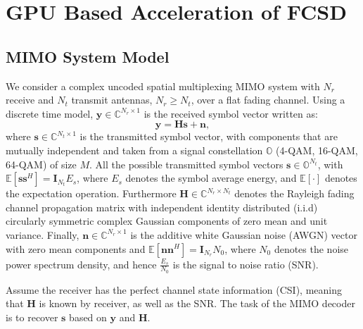 \documentclass[letterpaper, 10pt, conference,twoside]{ieeeconf}
\begin{document}
\section{GPU Based Acceleration of FCSD}\label{GPUFCSD}
\subsection{MIMO System Model}\label{system}

We consider a complex uncoded spatial multiplexing MIMO system with $N_r$ receive and $N_t$ transmit antennas, $N_{r}\geq N_{t}$, over a flat fading channel. Using a discrete time model, $\mathbf{y}\in\mathbb{C}^{N_{r}\times 1}$ is the received symbol vector written as:
\begin{equation}
\mathbf{y}=\mathbf{H}\mathbf{s}+\mathbf{n},   \label{formula 1}
\end{equation}
where $\mathbf{s}\in \mathbb{C}^{N_{t}\times 1}$ is the transmitted symbol vector, with components that are mutually independent and taken from a signal constellation $\mathbb{O}$ (4-QAM, 16-QAM, 64-QAM) of size $M$. All the possible transmitted symbol vectors $\mathbf{s}\in \mathbb{O}^{N_{t}}$, with $\mathbb{E}[\mathbf{s}\mathbf{s}^{H}]=\mathbf{I}_{N_t}E_{s}$, where $E_{s}$ denotes the symbol average energy, and $\mathbb{E}[\cdot]$ denotes the expectation operation. Furthermore $\mathbf{H}\in \mathbb{C}^{N_{r}\times N_{t}}$ denotes the Rayleigh fading channel propagation matrix with independent identity distributed (i.i.d) circularly symmetric complex Gaussian components of zero mean and unit variance. Finally, $\mathbf{n}\in \mathbb{C}^{N_{r}\times 1}$ is the additive white Gaussian noise (AWGN) vector with zero mean components and $\mathbb{E}[\mathbf{n}\mathbf{n}^{H}]=\mathbf{I}_{N_{r}}N_{0}$, where $N_{0}$ denotes the noise power spectrum density, and hence $\frac{E_{s}}{N_{0}}$ is the signal to noise ratio (SNR). 

Assume the receiver has the perfect channel state information (CSI), meaning that $ \mathbf{H}$ is known by receiver, as well as the SNR. The task of the MIMO decoder is to recover $\mathbf{s}$ based on $\mathbf{y}$ and $\mathbf{H}$.
\end{document}
